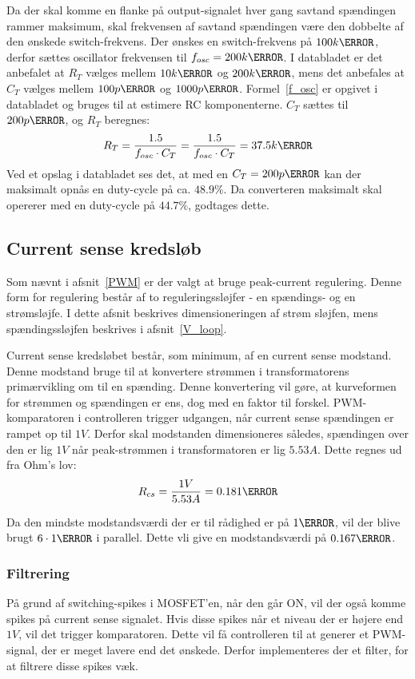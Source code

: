 Da der skal komme en flanke på output-signalet hver gang savtand spændingen rammer maksimum, skal frekvensen af savtand spændingen være den dobbelte af den ønskede switch-frekvens. Der ønskes en switch-frekvens på $100k\hertz$, derfor sættes oscillator frekvensen til $f_{osc}=200k\hertz$. I databladet er det anbefalet at $R_T$ vælges mellem $10k\ohm$ og $200k\ohm$, mens det anbefales at $C_T$ vælges mellem $100p\farad$ og $1000p\farad$. Formel~\ref{f_osc} er opgivet i databladet og bruges til at estimere RC komponenterne. $C_T$ sættes til $200p\farad$, og $R_T$ beregnes:
\begin{equation} \label{f_osc}
R_{T} = \frac{1.5}{f_{osc} \cdot C_T} = \frac{1.5}{f_{osc} \cdot C_T} = 37.5k\ohm
\end{equation}
Ved et opslag i databladet ses det, at med en $C_T=200p\farad$ kan der maksimalt opnås en duty-cycle på ca. $48.9\percent$. Da converteren maksimalt skal opererer med en duty-cycle på $44.7\percent$, godtages dette.

\subsection{Current sense kredsløb} \label{CS_loop}
Som nævnt i afsnit~\ref{PWM} er der valgt at bruge peak-current regulering. Denne form for regulering består af to reguleringssløjfer - en spændings- og en strømsløjfe. I dette afsnit beskrives dimensioneringen af strøm sløjfen, mens spændingssløjfen beskrives i afsnit~\ref{V_loop}.

Current sense kredsløbet består, som minimum, af en current sense modstand. Denne modstand bruge til at konvertere strømmen i transformatorens primærvikling om til en spænding. Denne konvertering vil gøre, at kurveformen for strømmen og spændingen er ens, dog med en faktor til forskel. PWM-komparatoren i controlleren trigger udgangen, når current sense spændingen er rampet op til $1V$. Derfor skal modstanden dimensioneres således, spændingen over den er lig $1V$ når peak-strømmen i transformatoren er lig $5.53A$. Dette regnes ud fra Ohm's lov:
\begin{equation} \label{R_cs}
R_{cs} = \frac{1V}{5.53A} = 0.181\ohm
\end{equation}

Da den mindste modstandsværdi der er til rådighed er på $1\ohm$, vil der blive brugt $6\cdot 1\ohm$ i parallel. Dette vli give en modstandsværdi på $0.167\ohm$. 



\subsubsection{Filtrering}
På grund af switching-spikes i MOSFET'en, når den går ON, vil der også komme spikes på current sense signalet. Hvis disse spikes når et niveau der er højere end $1V$, vil det trigger komparatoren. Dette vil få controlleren til at generer et PWM-signal, der er meget lavere end det ønskede. Derfor implementeres der et filter, for at filtrere disse spikes væk.


